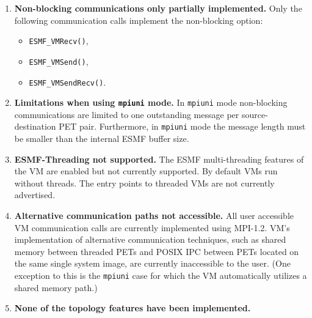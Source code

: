 

\begin{enumerate}

\item {\bf Non-blocking communications only partially implemented.} Only the following communication calls implement the non-blocking option:
\begin{itemize}
\item {\tt ESMF\_VMRecv()},
\item {\tt ESMF\_VMSend()},
\item {\tt ESMF\_VMSendRecv()}.
\end{itemize}

\item {\bf Limitations when using {\tt mpiuni} mode.} In {\tt mpiuni} mode non-blocking communications are limited to one outstanding message per source-destination PET pair. Furthermore, in {\tt mpiuni} mode the message length must be smaller than the internal ESMF buffer size.

\item {\bf ESMF-Threading not supported.} The ESMF multi-threading features of the VM are enabled but not currently supported. By default VMs run without threads. The entry points to threaded VMs are not currently advertised.

\item {\bf Alternative communication paths not accessible.} All user accessible VM communication calls are currently implemented using MPI-1.2. VM's implementation of alternative communication techniques, such as shared memory between threaded PETs and POSIX IPC between PETs located on the same single system image, are currently inaccessible to the user. (One exception to this is the {\tt mpiuni} case for which the VM automatically utilizes a shared memory path.)

\item {\bf None of the topology features have been implemented.}

\end{enumerate}


